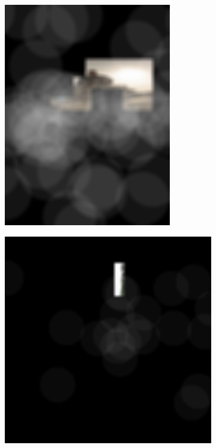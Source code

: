 \begin{figure}[H]
    \centering
    \begin{subfigure}[b]{0.4\textwidth}
        \centering
        \includegraphics[width=0.8\textwidth]{./images/augmented-1.jpg}
    \end{subfigure}
    \hfill
    \begin{subfigure}[b]{0.4\textwidth}
        \centering
        \includegraphics[width=\textwidth]{./images/augmented-2.jpg}

\end{subfigure}
\end{figure}
